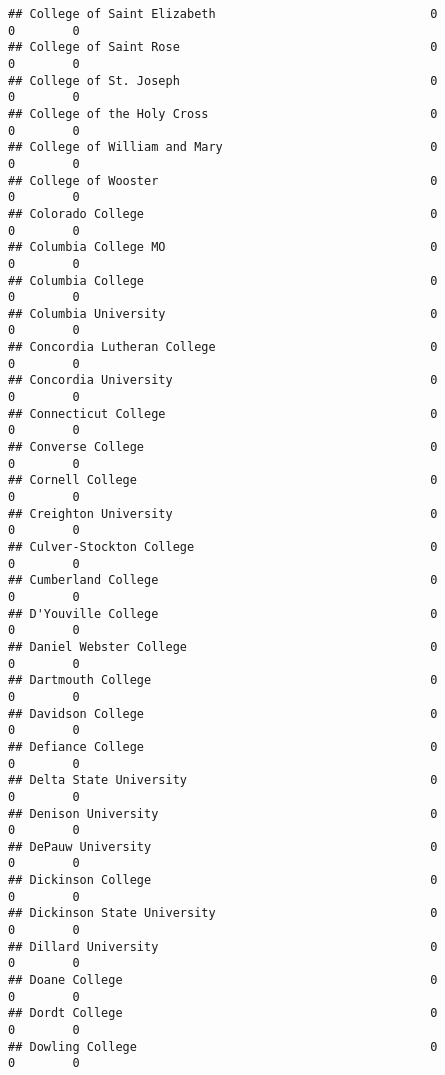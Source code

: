 \documentclass[
]{article}
\begin{document}
\begin{verbatim}
## College of Saint Elizabeth                              0           0        0
## College of Saint Rose                                   0           0        0
## College of St. Joseph                                   0           0        0
## College of the Holy Cross                               0           0        0
## College of William and Mary                             0           0        0
## College of Wooster                                      0           0        0
## Colorado College                                        0           0        0
## Columbia College MO                                     0           0        0
## Columbia College                                        0           0        0
## Columbia University                                     0           0        0
## Concordia Lutheran College                              0           0        0
## Concordia University                                    0           0        0
## Connecticut College                                     0           0        0
## Converse College                                        0           0        0
## Cornell College                                         0           0        0
## Creighton University                                    0           0        0
## Culver-Stockton College                                 0           0        0
## Cumberland College                                      0           0        0
## D'Youville College                                      0           0        0
## Daniel Webster College                                  0           0        0
## Dartmouth College                                       0           0        0
## Davidson College                                        0           0        0
## Defiance College                                        0           0        0
## Delta State University                                  0           0        0
## Denison University                                      0           0        0
## DePauw University                                       0           0        0
## Dickinson College                                       0           0        0
## Dickinson State University                              0           0        0
## Dillard University                                      0           0        0
## Doane College                                           0           0        0
## Dordt College                                           0           0        0
## Dowling College                                         0           0        0

\end{verbatim}
\end{document}
